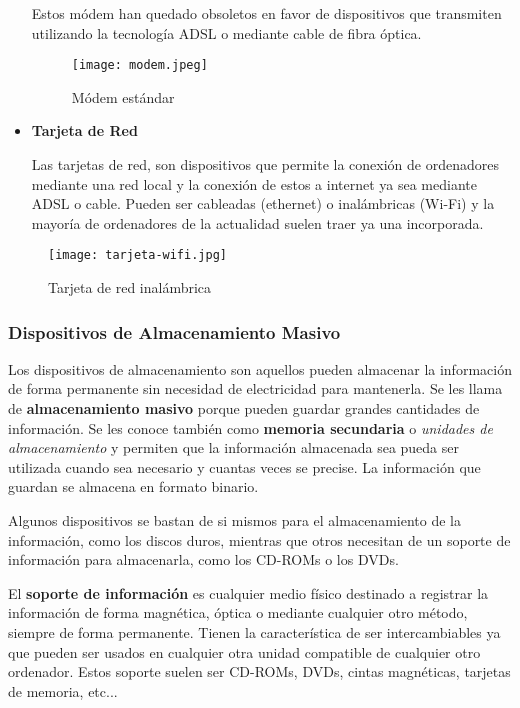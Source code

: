 \begin{itemize}
    Estos módem han quedado obsoletos en favor de dispositivos que transmiten utilizando la tecnología ADSL o mediante cable de fibra óptica.

    \begin{figure}[ht]
        \centering
        \texttt{[image: modem.jpeg]}
        \caption{Módem estándar}
    \end{figure}

    \item \textbf{Tarjeta de Red}

    Las tarjetas de red, son dispositivos que permite la conexión de ordenadores mediante una red local y la conexión de estos a internet ya sea mediante ADSL o cable. Pueden ser cableadas (ethernet) o inalámbricas (Wi-Fi) y la mayoría de ordenadores de la actualidad suelen traer ya una incorporada.
\end{itemize}

\begin{figure}[ht]
    \centering
    \texttt{[image: tarjeta-wifi.jpg]}
    \caption{Tarjeta de red inalámbrica}
\end{figure}

\subsubsection{Dispositivos de Almacenamiento Masivo}

Los dispositivos de almacenamiento son aquellos pueden almacenar la información de forma permanente sin necesidad de electricidad para mantenerla. Se les llama de \textbf{almacenamiento masivo} porque pueden guardar grandes cantidades de información. Se les conoce también como \textbf{memoria secundaria} o \textit{unidades de almacenamiento} y permiten que la información almacenada sea pueda ser utilizada cuando sea necesario y cuantas veces se precise. La información que guardan se almacena en formato binario.

Algunos dispositivos se bastan de si mismos para el almacenamiento de la información, como los discos duros, mientras que otros necesitan de un soporte de información para almacenarla, como los CD-ROMs o los DVDs.

El \textbf{soporte de información} es cualquier medio físico destinado a registrar la información de forma magnética, óptica o mediante cualquier otro método, siempre de forma permanente. Tienen la característica de ser intercambiables ya que pueden ser usados en cualquier otra unidad compatible de cualquier otro ordenador. Estos soporte suelen ser CD-ROMs, DVDs, cintas magnéticas, tarjetas de memoria, etc...

